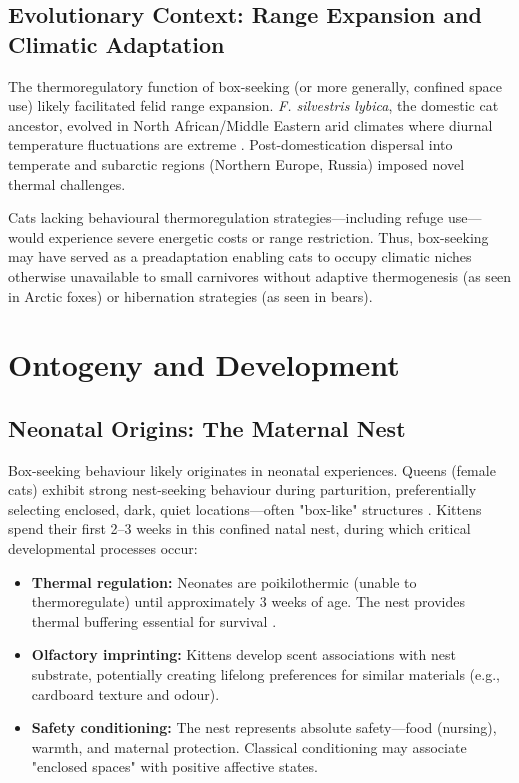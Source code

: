 \documentclass[12pt,a4paper]{article}
\begin{document}
\subsection{Evolutionary Context: Range Expansion and Climatic Adaptation}

The thermoregulatory function of box-seeking (or more generally, confined space use) likely facilitated felid range expansion. \textit{F. silvestris lybica}, the domestic cat ancestor, evolved in North African/Middle Eastern arid climates where diurnal temperature fluctuations are extreme \citep{driscoll2007}. Post-domestication dispersal into temperate and subarctic regions (Northern Europe, Russia) imposed novel thermal challenges.

Cats lacking behavioural thermoregulation strategies—including refuge use—would experience severe energetic costs or range restriction. Thus, box-seeking may have served as a preadaptation enabling cats to occupy climatic niches otherwise unavailable to small carnivores without adaptive thermogenesis (as seen in Arctic foxes) or hibernation strategies (as seen in bears).

\section{Ontogeny and Development}

\subsection{Neonatal Origins: The Maternal Nest}

Box-seeking behaviour likely originates in neonatal experiences. Queens (female cats) exhibit strong nest-seeking behaviour during parturition, preferentially selecting enclosed, dark, quiet locations—often "box-like" structures \citep{feldman1994}. Kittens spend their first 2–3 weeks in this confined natal nest, during which critical developmental processes occur:

\begin{itemize}
    \item \textbf{Thermal regulation:} Neonates are poikilothermic (unable to thermoregulate) until approximately 3 weeks of age. The nest provides thermal buffering essential for survival \citep{olmstead1979}.
    
    \item \textbf{Olfactory imprinting:} Kittens develop scent associations with nest substrate, potentially creating lifelong preferences for similar materials (e.g., cardboard texture and odour).
    
    \item \textbf{Safety conditioning:} The nest represents absolute safety—food (nursing), warmth, and maternal protection. Classical conditioning may associate "enclosed spaces" with positive affective states.
\end{itemize}
\end{document}
